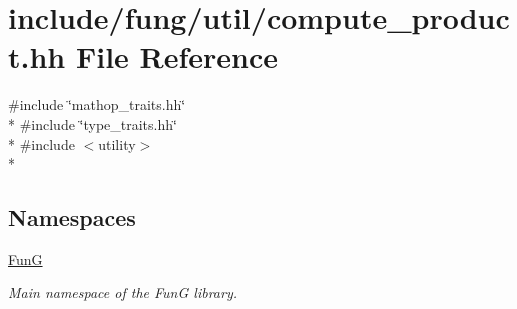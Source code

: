 \hypertarget{compute__product_8hh}{}\section{include/fung/util/compute\+\_\+product.hh File Reference}
\label{compute__product_8hh}
{\ttfamily \#include \char`\"{}mathop\+\_\+traits.\+hh\char`\"{}}\\*
{\ttfamily \#include \char`\"{}type\+\_\+traits.\+hh\char`\"{}}\\*
{\ttfamily \#include $<$utility$>$}\\*
\subsection*{Namespaces}
\begin{DoxyCompactItemize}
\item 
 \hyperlink{namespaceFunG}{FunG}
\begin{DoxyCompactList}\small\item\em Main namespace of the FunG library. \end{DoxyCompactList}\end{DoxyCompactItemize}
